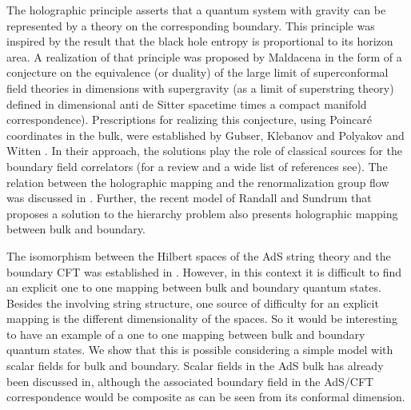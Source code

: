 \documentclass[a4paper,12pt]{article}
\begin{document}
The holographic principle asserts that  a 
quantum system with gravity can be represented by  a theory on the 
corresponding boundary\cite{HOL1,HOL2,HOL3}.
This principle was inspired by the  result that the black hole
entropy is proportional to its horizon area\cite{BHE1,BHE2}.
A realization of that principle was proposed by Maldacena in the form of a 
conjecture\cite{Malda} on the equivalence (or duality) of the large 
\coordHE{} limit of \coordHE{} superconformal field theories in \coordHE{}
dimensions with supergravity (as a limit of superstring theory) defined in 
\coordHE{} dimensional anti de Sitter spacetime
times a compact manifold \coordHE{} correspondence). 
Prescriptions for realizing this conjecture, using Poincar\'e 
coordinates in the \coordHE{} bulk, were established by  
Gubser, Klebanov and Polyakov \cite{GKP} and  Witten \cite{Wi}. 
In their approach, the \coordHE{} solutions play the role of 
classical sources for the boundary field correlators (for a review and a wide list
of references see\cite{Pe,Malda2}).
The relation between the holographic mapping and the 
renormalization group flow was discussed in \cite{BK}.
Further, the recent model of Randall and Sundrum\cite{RS} that proposes a solution
to the  hierarchy problem also presents holographic mapping between \coordHE{} bulk and 
boundary\cite{Ve}. 


The isomorphism between  the Hilbert spaces of the AdS string theory and
the boundary CFT was established in \cite{HS1,HS2,HS3,HS4}.
However, in this context it is difficult to find an explicit one to one mapping
between bulk and boundary quantum states.
Besides the involving string structure, one source of difficulty for an explicit 
mapping is the different dimensionality of the spaces.
So it would be interesting to have an example of a one to one mapping 
between bulk and boundary quantum states. We show that this is possible 
considering a simple model with scalar fields for bulk and boundary.
Scalar fields in the AdS bulk has already been discussed in\cite{GKP,Wi},
although the associated boundary field in the AdS/CFT correspondence would be composite 
as can be seen from its conformal dimension.
\end{document}
